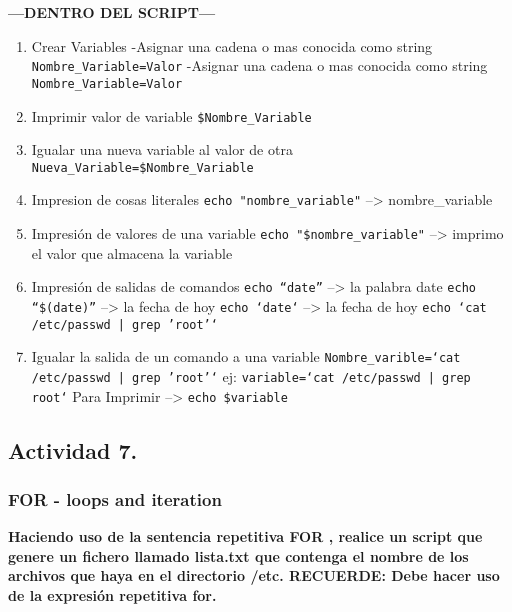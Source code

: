 \documentclass[a4paper,11pt,spanish]{article} %
\begin{document}
\textbf{---DENTRO DEL SCRIPT---}
\begin{enumerate}
\item Crear Variables
  \subitem -Asignar una cadena o mas conocida como string \\ \texttt{Nombre\_Variable=Valor}
  \subitem -Asignar una cadena o mas conocida como string \\ \texttt{Nombre\_Variable=Valor}

\item Imprimir valor de variable
  \subitem \texttt{\$Nombre\_Variable}
  
\item Igualar una nueva variable al valor de otra
  \subitem \texttt{Nueva\_Variable=\$Nombre\_Variable}

\item Impresion de cosas literales
  \subitem \texttt{echo "nombre\_variable"} --> nombre\_variable
  
\item Impresión de valores de una variable
  \subitem \texttt{echo "\$nombre\_variable"} --> imprimo el valor que almacena la variable

\item Impresión de salidas de comandos
  \subitem \texttt{echo ``date''}  -->  la palabra date
  \subitem \texttt{echo ``\$(date)''} -->  la fecha de hoy
  \subitem \texttt{echo `date`}  -->  la fecha de hoy
  \subitem \texttt{echo `cat /etc/passwd | grep 'root'`}
  
\item Igualar la salida de un comando a una variable
  \subitem \texttt{Nombre\_varible=`cat /etc/passwd | grep 'root'`}
  \subitem ej: \texttt{variable=`cat /etc/passwd | grep root`}
  \subitem Para Imprimir --> \texttt{echo \$variable}
\end{enumerate}

\cite{mirizioe2}

\subsection{Actividad 7.}

\subsubsection{FOR - loops and iteration}

\textbf{Haciendo uso de la sentencia repetitiva FOR , realice un script que genere un fichero llamado lista.txt que contenga el nombre de los archivos que haya en el directorio /etc.
RECUERDE: Debe hacer uso de la expresión repetitiva for.}
\end{document}
